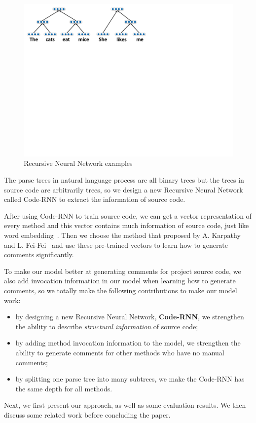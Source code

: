 \begin{figure}[h]
	\centering
	\includegraphics[width=\linewidth]{img/rnn_1.pdf}
	\caption{Recursive Neural Network examples}
	\label{rnn:nlp}
\end{figure}

The parse trees in natural language process are all binary trees  
but the trees in source code are arbitrarily trees, so we design a new Recursive Neural Network called Code-RNN to extract the information of source code.

After using Code-RNN to train source code, we can get a vector representation of every method and this vector contains much information of source code, just like word embedding~\cite{mikolov2013distributed}. Then we choose the method that proposed by A. Karpathy and L. Fei-Fei~\cite{karpathy2015deep} and use these pre-trained vectors to learn how to generate comments significantly.

To make our model better at generating comments for project source code, we also add invocation information in our model when learning how to generate comments, so we totally make the following contributions to make our model work:
\begin{itemize}
\item by designing a new Recursive Neural Network, \textbf{Code-RNN}, we strengthen the ability to describe {\em structural information}
of source code;
\item by adding method invocation information to the model,
we strengthen the ability to generate comments for other methods who have no manual comments;
\item by splitting one parse tree into many subtrees, we make the Code-RNN has the same depth for all methods.
\end{itemize}

Next, we first present our approach, as well as some evaluation results. We then
discuss some related work before concluding the paper.
